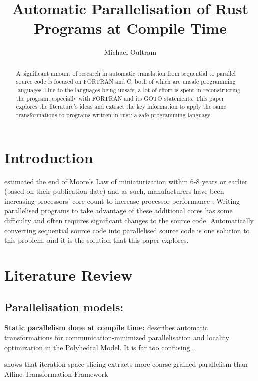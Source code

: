 \documentclass[conference]{IEEEtran}
\begin{document}
\title{Automatic Parallelisation of Rust Programs at Compile Time}

\author{Michael Oultram}

\maketitle

\begin{abstract}
  A significant amount of research in automatic translation from sequential to parallel source code is focused on FORTRAN and C, both of which are unsafe programming languages. Due to the languages being unsafe, a lot of effort is spent in reconstructing the program, especially with FORTRAN and its GOTO statements.
  This paper explores the literature's ideas and extract the key information to apply the same transformations to programs written in rust: a safe programming language.
\end{abstract}

\section{Introduction}
\textcite{Kish2002} estimated the end of Moore's Law of miniaturization within 6-8 years or earlier (based on their publication date) and as such, manufacturers have been increasing processors' core count to increase processor performance \parencite{Geer2005}. Writing parallelised programs to take advantage of these additional cores has some difficulty and often requires significant changes to the source code. Automatically converting sequential source code into parallelised source code is one solution to this problem, and it is the solution that this paper explores.

\section{Literature Review}
\subsection{Parallelisation models:}
\textbf{Static parallelism done at compile time:}
\textcite{Bondhugula2008} describes automatic transformations for
communication-minimized parallelisation and locality optimization in the Polyhedral Model. It is far too confusing...

\textcite{Beletska2011} shows that iteration space slicing extracts more coarse-grained parallelism than Affine Transformation Framework
\end{document}
